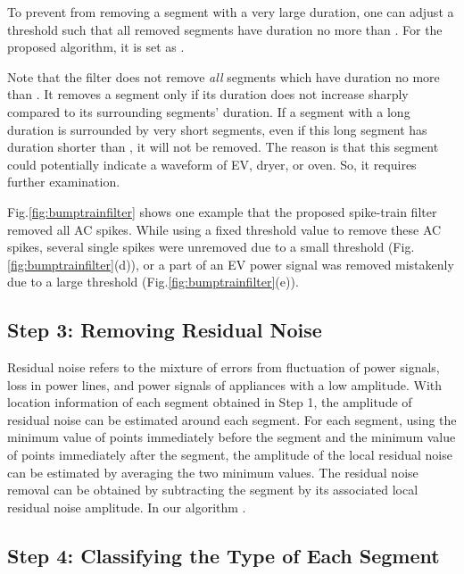 \documentclass[conference]{IEEEtran}
\begin{document}
To prevent from removing a segment with a very large duration, one can adjust a threshold  such that all removed segments have duration no more than . For the proposed algorithm, it is set as .


Note that the filter does not remove \emph{all} segments which have duration no more than . It removes a segment only if its duration does not increase sharply compared to its surrounding segments' duration. If a segment with a long duration is surrounded by very short segments, even if this long segment has duration shorter than , it will not be removed. The reason is that this segment could potentially indicate a waveform of EV, dryer, or oven.  So, it requires  further examination.

Fig.\ref{fig:bumptrainfilter} shows one example that the proposed spike-train filter removed all AC spikes. While using a fixed threshold value to remove these AC spikes, several single spikes were unremoved due to a small threshold (Fig.\ref{fig:bumptrainfilter}(d)), or a part of an EV power signal was removed mistakenly due to a large threshold (Fig.\ref{fig:bumptrainfilter}(e)).









\subsection{Step 3: Removing Residual Noise}

Residual noise refers to the mixture of errors from fluctuation of power signals, loss in power lines, and power signals of appliances with a low amplitude. With location information of each segment obtained in Step 1, the amplitude of residual noise can be estimated around each segment. For each segment, using the minimum value of  points immediately before the segment and the minimum value of  points immediately after the segment, the amplitude of the local residual noise can be estimated by averaging the two minimum values.  The residual noise removal can be obtained by subtracting the segment by its associated local residual noise amplitude. In our algorithm .



\subsection{Step 4: Classifying the Type of Each Segment}
\end{document}
